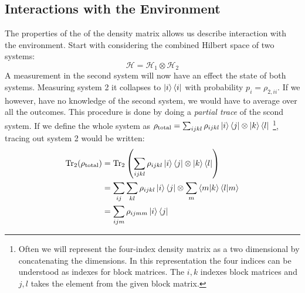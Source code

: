 \subsection{Interactions with the Environment}\label{sec:density_with_env}
The properties of the of the density matrix allows us describe interaction with the environment. Start with considering the combined Hilbert space of two systems:
\begin{equation}
    \mathcal{H} = \mathcal{H}_1 \otimes \mathcal{H}_2
\end{equation}
A measurement in the second system will now have an effect the state of both systems. Measuring system 2 it collapses to $\ket{i}\bra{i}$ with probability $p_i = \rho_{2, ii}$. If we however, have no knowledge of the second system, we would have to average over all the outcomes. This procedure is done by doing a \textit{partial trace} of the scond system. If we define the whole system as $\rho_{\text{total}} = \sum_{ijkl}\rho_{ijkl}\ket{i}\bra{j}\otimes\ket{k}\bra{l}$ \footnote{Often we will represent the four-index density matrix as a two dimensional by concatenating the dimensions. In this representation the four indices can be understood as indexes for block matrices. The $i, k$ indexes block matrices and $j, l$ takes the element from the given block matrix.}, tracing out system 2 would be written:
\begin{align}
    \Tr_2 (\rho_{\text{total}})   &= \Tr_2 \left(\sum_{ijkl} \rho_{ijkl} \ket{i}\bra{j} \otimes \ket{k}\bra{l}\right) \nonumber \\
                                    &= \sum_{ij}\sum_{kl} \rho_{ijkl} \ket{i}\bra{j} \otimes \sum_m \bra{m}  \ket{k}\bra{l}\ket{m} \nonumber \\
    &= \sum_{ijm} \rho_{ijmm} \ket{i}\bra{j}
\end{align}
